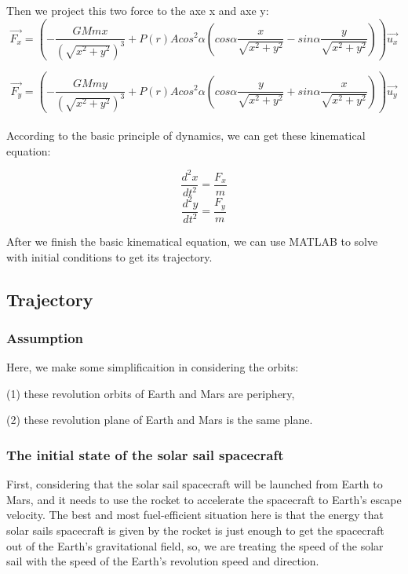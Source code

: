 \documentclass[../Paper.tex]{subfiles}
\begin{document}
Then we project this two force to the axe x and axe y:
\begin{equation}
\vec{F_x} = (-\frac{GMmx}{(\sqrt{x^2+y^2})^3} + P(r)Acos^2\alpha(cos\alpha\frac{x}{\sqrt{x^2+y^2}} - sin\alpha\frac{y}{\sqrt{x^2+y^2}}))\vec{u_x}
\label{eq:diffx}
\end{equation}

\begin{equation}
\vec{F_y} = (-\frac{GMmy}{(\sqrt{x^2+y^2})^3} + P(r)Acos^2\alpha(cos\alpha\frac{y}{\sqrt{x^2+y^2}} + sin\alpha\frac{x}{\sqrt{x^2+y^2}}))\vec{u_y}
\label{eq:diffy}
\end{equation}
\\

According to the basic principle of dynamics, we can get these kinematical equation:

\begin{equation}
\frac{d^2x}{dt^2} = \frac{F_x}{m}
\end{equation}
\begin{equation}
\frac{d^2y}{dt^2} = \frac{F_y}{m}
\end{equation}

After we finish the basic kinematical equation, we can use MATLAB to solve with initial conditions to get its trajectory.

\subsection{Trajectory}

\subsubsection{Assumption}

Here, we make some simplificaition in considering the orbits: 

(1) these revolution orbits of Earth and Mars are periphery,          

(2) these revolution plane of Earth and Mars is the same plane.   

\subsubsection{The initial state of the solar sail spacecraft}

First, considering that the solar sail spacecraft will be launched from Earth to Mars, and it needs to use the rocket to accelerate the spacecraft to Earth's escape velocity. The best and most fuel-efficient situation here is that the energy that solar sails spacecraft is given by the rocket is just enough to get the spacecraft out of the Earth's gravitational field, so, we are treating the speed of the solar sail with the speed of the Earth's revolution speed  and direction.
\end{document}
